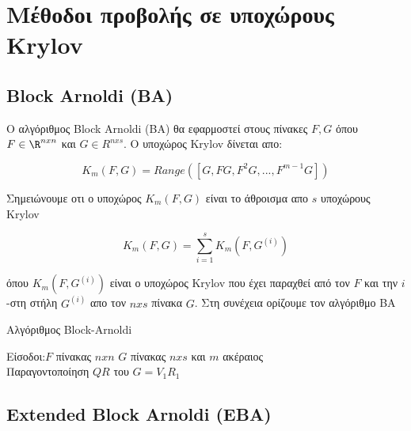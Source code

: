 ﻿
\chapter{Μέθοδοι προβολής σε υποχώρους Krylov}
\label{ch:5.chapterAlgorithms}

\section{\textlatin{Block Arnoldi (BA)}}
Ο αλγόριθμος \textlatin{Block Arnoldi (BA)} θα εφαρμοστεί στους πίνακες $F, G$ όπου $F \in \R^{nxn}$ και $G \in R^{nxs}$. Ο υποχώρος \textlatin{Krylov} δίνεται απο:

\begin{equation}
K_m(F,G) = Range([G, F G,F^2G,...,F^{m-1}G])
\end{equation}

Σημειώνουμε οτι ο υποχώρος $K_m(F,G)$ είναι το άθροισμα απο $s$ υποχώρους \textlatin{Krylov}

\begin{equation}
K_m(F,G) = \sum_{i=1}^{s}K_m(F,G^{(i)})
\end{equation}

όπου $K_m(F, G^{(i)})$ είναι ο υποχώρος \textlatin{Krylov} που έχει παραχθεί από τον $F$ και την $i$-στη στήλη $G^{(i)}$ απο τον $n x s$ πίνακα $G$.
Στη συνέχεια ορίζουμε τον αλγόριθμο ΒΑ ~\cite{heyouni2010extended, articleKrylovSubspaceMethods,jbilou2003block}

\begin{algorithm}[H]
    \SetAlgoLined
    \caption{ Αλγόριθμος  Block-Arnoldi}
    Είσοδοι:$F$ πίνακας $n x n$ $G$ πίνακας $n x s$ και $m$ ακέραιος\\
    Παραγοντοποίηση $QR$ του $G = V_1 R_1$\\
\end{algorithm}



\section{\textlatin{Extended Block Arnoldi (EBA)}} \label{EBA}

